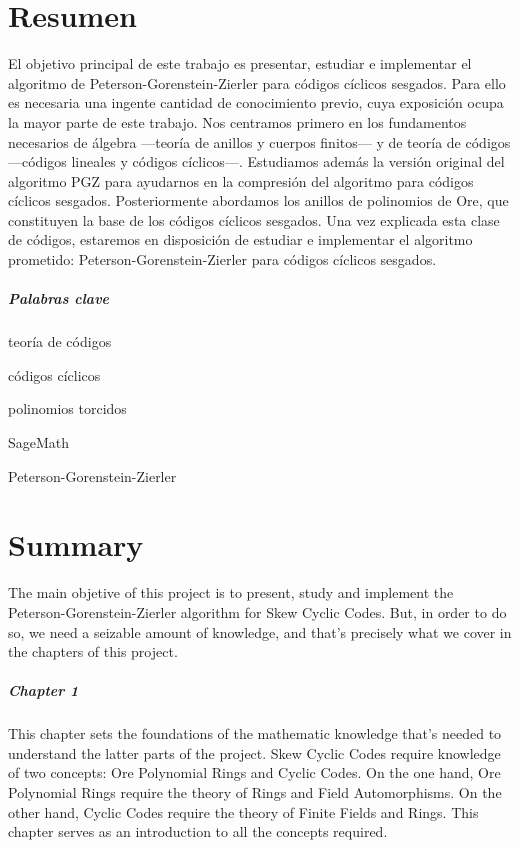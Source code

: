 \chapter*{Resumen}

El objetivo principal de este trabajo es presentar, estudiar e implementar el algoritmo de Peterson-Gorenstein-Zierler para códigos cíclicos sesgados.
Para ello es necesaria una ingente cantidad de conocimiento previo, cuya exposición ocupa la mayor parte de este trabajo.
Nos centramos primero en los fundamentos necesarios de álgebra —teoría de anillos y cuerpos finitos— y de teoría de códigos —códigos lineales y códigos cíclicos—.
Estudiamos además la versión original del algoritmo PGZ para ayudarnos en la compresión del algoritmo para códigos cíclicos sesgados.
Posteriormente abordamos los anillos de polinomios de Ore, que constituyen la base de los códigos cíclicos sesgados.
Una vez explicada esta clase de códigos, estaremos en disposición de estudiar e implementar el algoritmo prometido: Peterson-Gorenstein-Zierler para códigos cíclicos sesgados.

\paragraph{Palabras clave}
\begin{itemize*}[label=,itemsep=4em,itemjoin=\hspace{2em}]
  \item teoría de códigos
  \item códigos cíclicos
  \item polinomios torcidos
  \item SageMath
  \item Peterson-Gorenstein-Zierler
\end{itemize*}

\chapter*{Summary}

The main objetive of this project is to present, study and implement the Peterson-Gorenstein-Zierler algorithm for Skew Cyclic Codes.
But, in order to do so, we need a seizable amount of knowledge, and that's precisely what we cover in the chapters of this project.

\paragraph{Chapter 1} This chapter sets the foundations of the mathematic knowledge that's needed to understand the latter parts of the project. 
Skew Cyclic Codes require knowledge of two concepts: Ore Polynomial Rings and Cyclic Codes. 
On the one hand, Ore Polynomial Rings require the theory of Rings and Field Automorphisms. 
On the other hand, Cyclic Codes require the theory of Finite Fields and Rings. 
This chapter serves as an introduction to all the concepts required.

